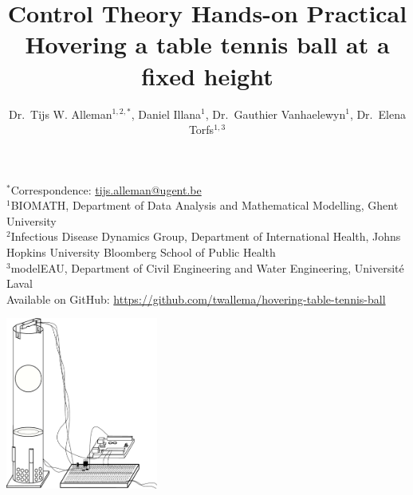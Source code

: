 \documentclass[10pt,twoside,openright]{article}
\begin{document}
\title{%
  Control Theory Hands-on Practical \\
  \Large Hovering a table tennis ball at a fixed height}
  
\author{Dr.~Tijs W. Alleman$^{1,2,*}$, Daniel Illana$^{1}$, Dr.~Gauthier Vanhaelewyn$^{1}$, Dr.~Elena Torfs$^{1,3}$}
\maketitle

$^*$Correspondence: \url{tijs.alleman@ugent.be} \\
$^1$BIOMATH, Department of Data Analysis and Mathematical Modelling, Ghent University\\
$^2$Infectious Disease Dynamics Group, Department of International Health, Johns Hopkins University Bloomberg School of Public Health\\
$^3$modelEAU, Department of Civil Engineering and Water Engineering, Universit\'e Laval\\
Available on GitHub: \url{https://github.com/twallema/hovering-table-tennis-ball}\\

\begin{center}
\includegraphics[width=5cm]{setup.pdf}
\end{center}
\end{document}
